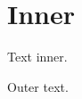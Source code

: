 \documentclass{article}
\begin{document}
\begin{minipage}{8cm}
\begin{minipage}{3cm}
\section{Inner}
Text inner.
\end{minipage}
Outer text.
\end{minipage}
\end{document}
